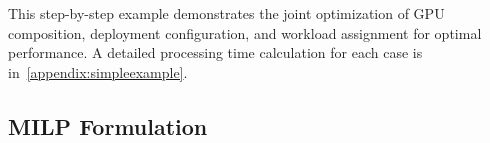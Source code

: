 This step-by-step example demonstrates the joint optimization of GPU composition, deployment configuration, and workload assignment for optimal performance. A detailed processing time calculation for each case is in~\autoref{appendix:simpleexample}.





\subsection{MILP Formulation}
\label{sec:milp formulation}



